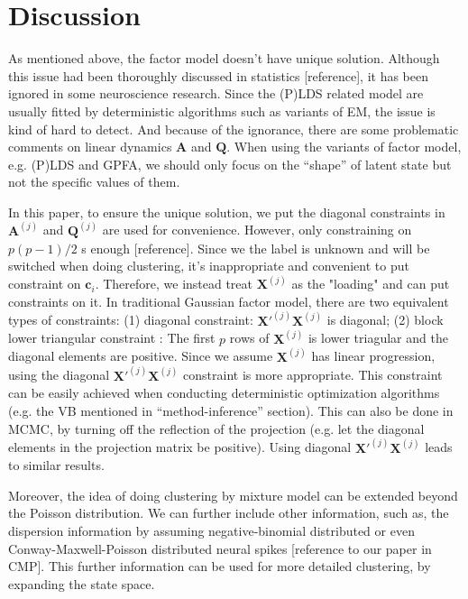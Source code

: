 \documentclass{article}
\begin{document}
	\section{Discussion}
	
	As mentioned above, the factor model doesn’t have unique solution. Although this issue had been thoroughly discussed in statistics [reference], it has been ignored in some neuroscience research. Since the (P)LDS related model are usually fitted by deterministic algorithms such as variants of EM, the issue is kind of hard to detect. And because of the ignorance, there are some problematic comments on linear dynamics $\bm{A}$ and $\bm{Q}$. When using the variants of factor model, e.g. (P)LDS and GPFA, we should only focus on the “shape” of latent state but not the specific values of them.
	
	In this paper, to ensure the unique solution, we put the diagonal constraints in $\bm{A}^{(j)}$ and $\bm{Q}^{(j)}$ are used for convenience. However, only constraining on $p(p-1)/2$ s enough [reference]. Since we the label is unknown and will be switched when doing clustering, it’s inappropriate and convenient to put constraint on $\bm{c}_i$. Therefore, we instead treat $\bm{X}^{(j)}$ as the "loading" and can put constraints on it. In traditional Gaussian factor model, there are two equivalent types of constraints: (1) diagonal constraint: $\bm{X}'^{(j)}\bm{X}^{(j)}$ is diagonal; (2) block lower triangular constraint \citep{Fokoue2003}: The first $p$ rows of $\bm{X}^{(j)}$ is lower triagular and the diagonal elements are positive. Since we assume $\bm{X}^{(j)}$ has linear progression, using the diagonal $\bm{X}'^{(j)}\bm{X}^{(j)}$ constraint is more appropriate. This constraint can be easily achieved when conducting deterministic optimization algorithms (e.g. the VB mentioned in “method-inference” section). This can also be done in MCMC, by turning off the reflection of the projection (e.g. let the diagonal elements in the projection matrix be positive). Using diagonal $\bm{X}'^{(j)}\bm{X}^{(j)}$  leads to similar results.
	
	Moreover, the idea of doing clustering by mixture model can be extended beyond the Poisson distribution. We can further include other information, such as, the dispersion information by assuming negative-binomial distributed or even Conway-Maxwell-Poisson distributed neural spikes [reference to our paper in CMP]. This further information can be used for more detailed clustering, by expanding the state space.
	
\end{document}
